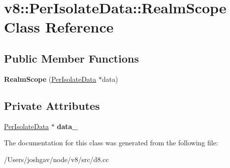 \hypertarget{classv8_1_1_per_isolate_data_1_1_realm_scope}{}\section{v8\+:\+:Per\+Isolate\+Data\+:\+:Realm\+Scope Class Reference}
\label{classv8_1_1_per_isolate_data_1_1_realm_scope}
\subsection*{Public Member Functions}
\begin{DoxyCompactItemize}
\item 
{\bfseries Realm\+Scope} (\hyperlink{classv8_1_1_per_isolate_data}{Per\+Isolate\+Data} $\ast$data)\hypertarget{classv8_1_1_per_isolate_data_1_1_realm_scope_a5779e979dff507151ee9340e6a8047d5}{}\label{classv8_1_1_per_isolate_data_1_1_realm_scope_a5779e979dff507151ee9340e6a8047d5}

\end{DoxyCompactItemize}
\subsection*{Private Attributes}
\begin{DoxyCompactItemize}
\item 
\hyperlink{classv8_1_1_per_isolate_data}{Per\+Isolate\+Data} $\ast$ {\bfseries data\+\_\+}\hypertarget{classv8_1_1_per_isolate_data_1_1_realm_scope_a632c018c4f301ec8b736a198e9b231a4}{}\label{classv8_1_1_per_isolate_data_1_1_realm_scope_a632c018c4f301ec8b736a198e9b231a4}

\end{DoxyCompactItemize}


The documentation for this class was generated from the following file\+:\begin{DoxyCompactItemize}
\item 
/\+Users/joshgav/node/v8/src/d8.\+cc\end{DoxyCompactItemize}
